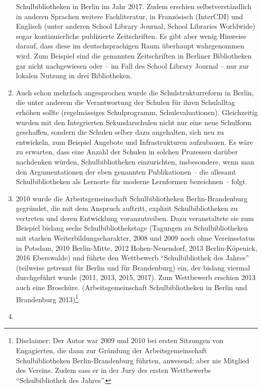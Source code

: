 \documentclass[a4paper,
fontsize=11pt,
oneside,
numbers=noperiodatend,
parskip=half-,
bibliography=totoc,
final
]{scrartcl}
\begin{document}
\begin{enumerate}
{    Schulbibliotheken in Berlin im Jahr 2017. Zudem erschien
    selbstverständlich in anderen Sprachen weitere Fachliteratur, in
    Französisch (InterCDI) und Englisch (unter anderen School Library
    Journal, School Libraries Worldwide) sogar kontinuierliche
    publizierte Zeitschriften. Es gibt aber wenig Hinweise darauf, dass
    diese im deutschsprachigen Raum überhaupt wahrgenommen wird. Zum
    Beispiel sind die genannten Zeitschriften in Berliner Bibliotheken
    gar nicht nachgewiesen oder -- im Fall des School Library Journal --
    nur zur lokalen Nutzung in drei Bibliotheken.}
\item
  Auch schon mehrfach angesprochen wurde die Schulstrukturreform in
  Berlin, die unter anderem die Verantwortung der Schulen für ihren
  Schulalltag erhöhen sollte (regelmässiges Schulprogramm,
  Schulevaluationen). Gleichzeitig wurden mit den Integrierten
  Sekundarschulen nicht nur eine neue Schulform geschaffen, sondern die
  Schulen selber dazu angehalten, sich neu zu entwickeln, zum Beispiel
  Angebote und Infrastrukturen aufzubauen. Es wäre zu erwarten, dass
  eine Anzahl der Schulen in solchen Prozessen darüber nachdenken
  würden, Schulbibliotheken einzurichten, insbesondere, wenn man den
  Argumentationen der eben genannten Publikationen -- die allesamt
  Schulbibliotheken als Lernorte für moderne Lernformen bezeichnen --
  folgt.
\item
  2010 wurde die Arbeitsgemeinschaft Schulbibliotheken
  Berlin-Brandenburg gegründet, die mit dem Anspruch auftritt, explizit
  Schulbibliotheken zu vertreten und deren Entwicklung voranzutreiben.
  Dazu veranstaltete sie zum Beispiel bislang sechs Schulbibliothekstage
  (Tagungen zu Schulbibliotheken mit starken Weiterbildungscharakter,
  2008 und 2009 noch ohne Vereinsstatus in Potsdam, 2010 Berlin-Mitte,
  2012 Hohen-Neuendorf, 2013 Berlin-Köpenick, 2016 Eberswalde) und
  führte den Wettbewerb \enquote{Schulbibliothek des Jahres} (teilweise
  getrennt für Berlin und für Brandenburg) ein, der bislang viermal
  durchgeführt wurde (2011, 2013, 2015, 2017). Zum Wettbewerb erschien
  2013 auch eine Broschüre. (Arbeitsgemeinschaft Schulbibliotheken in
  Berlin und Brandenburg 2013)\footnote{Disclaimer: Der Autor war 2009
    und 2010 bei ersten Sitzungen von Engagierten, die dann zur Gründung
    der Arbeitsgemeinschaft Schulbibliotheken Berlin-Brandenburg
    führten, anwesend; aber nie Mitglied des Vereins. Zudem sass er in
    der Jury des ersten Wettbewerbs \enquote{Schulbibliothek des
    Jahres}.}
\item

\end{enumerate}
\end{document}
